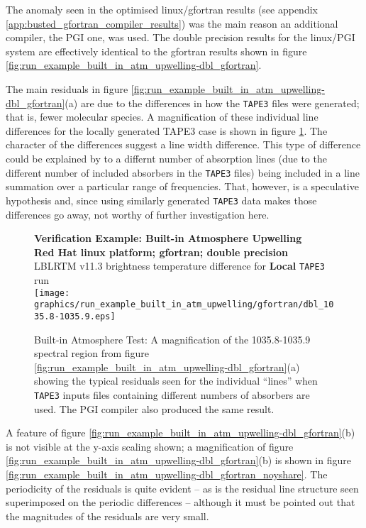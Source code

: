 The anomaly seen in the optimised linux/gfortran results (see appendix \ref{app:busted_gfortran_compiler_results}) was the main reason an additional compiler, the PGI one, was used. The double precision results for the linux/PGI system are effectively identical to the gfortran results shown in figure \ref{fig:run_example_built_in_atm_upwelling-dbl_gfortran}.

The main residuals in figure \ref{fig:run_example_built_in_atm_upwelling-dbl_gfortran}(a) are due to the differences in how the  \texttt{TAPE3} files were generated; that is, fewer molecular species. A magnification of these individual line differences for the locally generated TAPE3 case is shown in figure \ref{fig:run_example_built_in_atm_upwelling-dbl_gfortran_1035.8-1035.9}. The character of the differences suggest a line width difference. This type of difference could be explained by to a differnt number of absorption lines (due to the different number of included absorbers in the \texttt{TAPE3} files) being included in a line summation over a particular range of frequencies. That, however, is a speculative hypothesis and, since using similarly generated \texttt{TAPE3} data makes those differences go away, not worthy of further investigation here.

\begin{figure}[htp]
  \centering
  \qquad\sffamily\textbf{Verification Example: Built-in Atmosphere Upwelling}\\
  \qquad\sffamily\textbf{Red Hat linux platform; gfortran; double precision}\\
  \qquad\textsf{LBLRTM v11.3 brightness temperature difference for \textbf{Local} \texttt{TAPE3} run}\\
  \texttt{[image: graphics/run\_example\_built\_in\_atm\_upwelling/gfortran/dbl\_1035.8-1035.9.eps]}
  \caption{Built-in Atmosphere Test: A magnification of the 1035.8-1035.9\invcm{} spectral region from figure \ref{fig:run_example_built_in_atm_upwelling-dbl_gfortran}(a) showing the typical residuals seen for the individual ``lines'' when \texttt{TAPE3} inputs files containing different numbers of absorbers are used. The PGI compiler also produced the same result.}
  \label{fig:run_example_built_in_atm_upwelling-dbl_gfortran_1035.8-1035.9}
\end{figure}

A feature of figure \ref{fig:run_example_built_in_atm_upwelling-dbl_gfortran}(b) is not visible at the y-axis scaling shown; a magnification of figure \ref{fig:run_example_built_in_atm_upwelling-dbl_gfortran}(b) is shown in figure \ref{fig:run_example_built_in_atm_upwelling-dbl_gfortran_noyshare}. The periodicity of the residuals is quite evident -- as is the residual line structure seen superimposed on the periodic differences -- although it must be pointed out that the magnitudes of the residuals are very small.

